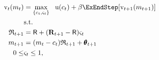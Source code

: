   \begin{equation*}\begin{gathered}\begin{aligned}
        {\vFunc}_{t}({m}_{t})  & = \max_{\{{c}_{t},\stigma_{t}\}}   ~~ \uFunc({c}_{t}) +  \DiscFac
        \ExEndStep[{\vFunc}_{t+1}({m}_{t+1})]
        \\      & \text{s.t.} \nonumber
        \\      \Rport_{t+1}  & = \Rfree + (\Risky_{t+1}-\Rfree) \stigma_{t}
        \\      {m}_{t+1}  & = ({m}_{t}-{c}_{t})\Rport_{t+1} + \TranShkEmp_{t+1}
        \\  0       \leq & \stigma_{t}  \leq 1, \label{eq:noshorts}
      \end{aligned}\end{gathered}\end{equation*}
